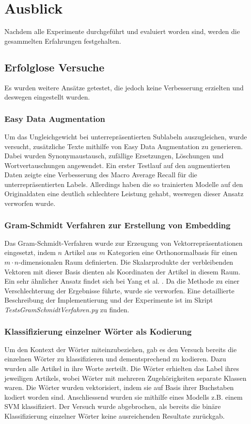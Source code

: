 \section{Ausblick}
\label{Ausblick}
Nachdem alle Experimente durchgeführt und evaluiert worden sind, werden die gesammelten Erfahrungen festgehalten.

\subsection{Erfolglose Versuche}
Es wurden weitere Ansätze getestet, die jedoch keine Verbesserung erzielten und deswegen eingestellt wurden.

\subsubsection{Easy Data Augmentation}
\label{EDA}
Um das Ungleichgewicht bei unterrepräsentierten Sublabeln auszugleichen, wurde versucht, zusätzliche Texte mithilfe von Easy Data Augmentation \cite{Wei2019} zu generieren. Dabei wurden Synonymaustausch, zufällige Ersetzungen, Löschungen und Wortvertauschungen angewendet. Ein erster Testlauf  auf den augmentierten Daten zeigte eine Verbesserung  des Macro Average Recall für die unterrepräsentierten Labels. Allerdings haben die so trainierten Modelle auf den Originaldaten eine deutlich schlechtere Leistung gehabt, weswegen dieser Ansatz verworfen wurde.

\subsubsection{Gram-Schmidt Verfahren zur Erstellung von Embedding}
\label{sec:gram}
Das Gram-Schmidt-Verfahren wurde zur Erzeugung von Vektorrepräsentationen eingesetzt, indem $n$ Artikel aus $m$ Kategorien eine Orthonormalbasis für einen $m\cdot n$-dimensionalen Raum definierten. Die Skalarprodukte der verbleibenden Vektoren mit dieser Basis dienten als Koordinaten der Artikel in diesem Raum. Ein sehr ähnlicher Ansatz findet sich bei Yang et al. \cite{Yang2019}. Da die Methode zu einer Verschlechterung der Ergebnisse führte, wurde sie verworfen. Eine detaillierte Beschreibung der Implementierung und der Experimente ist im Skript \textit{TestsGramSchmidtVerfahren.py} zu finden.

\subsubsection{Klassifizierung einzelner Wörter als Kodierung}
\label{sec:wordcoding}
Um den Kontext der Wörter miteinzubeziehen, gab es den Versuch bereits die einzelnen Wörter zu klassifizieren und dementsprechend zu kodieren. Dazu wurden alle Artikel in ihre Worte zerteilt. Die Wörter erhielten das Label ihres jeweiligen Artikels, wobei Wörter mit mehreren Zugehörigkeiten separate Klassen waren. Die Wörter wurden vektorisiert, indem sie auf Basis ihrer Buchstaben kodiert worden sind. Anschliessend wurden sie mithilfe eines Modells z.B. einem SVM klassifiziert. Der Versuch wurde abgebrochen, als bereits die binäre Klassifizierung einzelner Wörter keine ausreichenden Resultate zurückgab.

